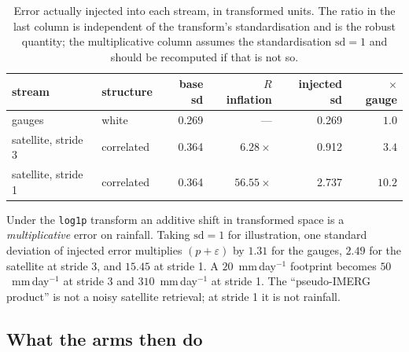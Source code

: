 \begin{table}[t]
\centering
\caption{Error actually injected into each stream, in transformed units. The
ratio in the last column is independent of the transform's standardisation and
is the robust quantity; the multiplicative column assumes the standardisation
$\mathrm{sd} = 1$ and should be recomputed if that is not so.}
\label{tab:injected-error}
\small
\begin{tabular}{llrrrr}
\hline
stream & structure & base sd & $R$ inflation & injected sd & $\times$ gauge \\
\hline
gauges                     & white      & 0.269 & ---            & 0.269 & $1.0$ \\
satellite, stride 3        & correlated & 0.364 & $6.28\times$   & 0.912 & $3.4$ \\
satellite, stride 1        & correlated & 0.364 & $56.55\times$  & 2.737 & $10.2$ \\
\hline
\end{tabular}
\end{table}

Under the \texttt{log1p} transform an additive shift in transformed space is a
\emph{multiplicative} error on rainfall. Taking $\mathrm{sd} = 1$ for
illustration, one standard deviation of injected error multiplies
$(p + \varepsilon)$ by $1.31$ for the gauges, $2.49$ for the satellite at
stride 3, and $15.45$ at stride 1. A $20$~mm\,day$^{-1}$ footprint becomes
$50$~mm\,day$^{-1}$ at stride 3 and $310$~mm\,day$^{-1}$ at stride 1. The
``pseudo-IMERG product'' is not a noisy satellite retrieval; at stride 1 it is
not rainfall.

\subsection{What the arms then do}

